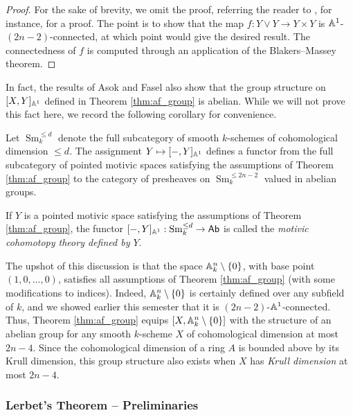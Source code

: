 \begin{proof}
    For the sake of brevity, we omit the proof, referring the reader to \cite[Proposition 4.1]{Lerbet}, for instance, for a proof. The point is to show that the map $f: Y \vee Y \to Y \times Y$ is $\mathbb{A}^1$-$(2n-2)$-connected, at which point \cite[Lemma 2.22]{Lerbet} would give the desired result. The connectedness of $f$ is computed through an application of the Blakers--Massey theorem.
\end{proof}

In fact, the results of Asok and Fasel \cite[Proposition 1.2.5]{AF-JEMS} also show that the group structure on $[X,Y]_{\mathbb{A}^1}$ defined in Theorem \ref{thm:af_group} is abelian. While we will not prove this fact here, we record the following corollary for convenience.

\begin{corollary}
    Let $\operatorname{Sm}_k^{\leq d}$ denote the full subcategory of smooth $k$-schemes of cohomological dimension $\leq d$. The assignment $Y \mapsto [-,Y]_{\mathbb{A}^1}$ defines a functor from the full subcategory of pointed motivic spaces satisfying the assumptions of Theorem \ref{thm:af_group} to the category of presheaves on $\operatorname{Sm}_k^{\leq 2n-2}$ valued in abelian groups. 
\end{corollary}

\begin{remark}
    If $Y$ is a pointed motivic space satisfying the assumptions of Theorem \ref{thm:af_group}, the functor $[-,Y]_{\mathbb{A}^1}: \operatorname{Sm}_k^{\leq d} \to \mathsf{Ab}$ is called the \textit{motivic cohomotopy theory defined by $Y$}.
\end{remark}

The upshot of this discussion is that the space $\mathbb{A}^n_k\setminus\{0\}$, with base point $(1,0,\ldots,0)$, satisfies all assumptions of Theorem \ref{thm:af_group} (with some modifications to indices). Indeed, $\mathbb{A}^n_k\setminus\{0\}$ is certainly defined over any subfield of $k$, and we showed earlier this semester that it is $(2n-2)$-$\mathbb{A}^1$-connected. Thus, Theorem \ref{thm:af_group} equips $[X,\mathbb{A}^n_k\setminus\{0\}]$ with the structure of an abelian group for any smooth $k$-scheme $X$ of cohomological dimension at most $2n-4$. Since the cohomological dimension of a ring $A$ is bounded above by its Krull dimension, this group structure also exists when $X$ has \textit{Krull dimension} at most $2n-4$.

\subsubsection{Lerbet's Theorem -- Preliminaries}


